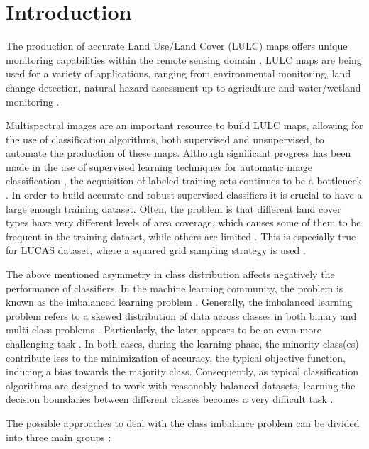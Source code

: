 \documentclass[remotesensing,article,submit,moreauthors,pdftex]{Definitions/mdpi}
\begin{document}
\section{Introduction}
The production of accurate Land Use/Land Cover (LULC) maps offers unique
monitoring capabilities within the remote sensing domain \cite{Mellor2015}. LULC
maps are being used for a variety of applications, ranging from environmental
monitoring, land change detection, natural hazard assessment up to agriculture
and water/wetland monitoring \cite{Khatami2016}.

Multispectral images are an important resource to build LULC maps, allowing for
the use of classification algorithms, both supervised and unsupervised, to
automate the production of these maps. Although significant progress has been
made in the use of supervised learning techniques for automatic image
classification \cite{Tewkesbury2015}, the acquisition of labeled training sets
continues to be a bottleneck \cite{Rajan2008}. In order to build accurate and
robust supervised classifiers it is crucial to have a large enough training
dataset. Often, the problem is that different land cover types have very
different levels of area coverage, which causes some of them to be frequent in
the training dataset, while others are limited \cite{Feng2019}. This is
especially true for LUCAS dataset, where a squared grid sampling strategy is
used \cite{Williams2009, Cenggoro2018}.

The above mentioned asymmetry in class distribution affects negatively the
performance of classifiers. In the machine learning community, the problem is
known as the imbalanced learning problem \cite{Chawla2004}. Generally, the
imbalanced learning problem refers to a skewed distribution of data across
classes in both binary and multi-class problems \cite{Abdi2016}. Particularly,
the later appears to be an even more challenging task \cite{Garcia2018}. In both
cases, during the learning phase, the minority class(es) contribute less to the
minimization of accuracy, the typical objective function, inducing a bias
towards the majority class. Consequently, as typical classification algorithms
are designed to work with reasonably balanced datasets, learning the decision
boundaries between different classes becomes a very difficult task
\cite{Saez2016}.

The possible approaches to deal with the class imbalance problem can be divided
into three main groups \cite{Fernandez2013}:
\end{document}
